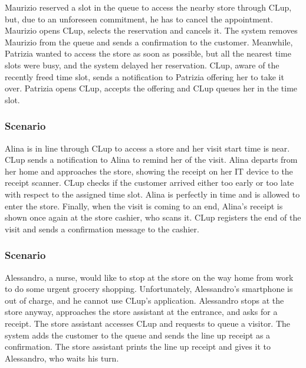 \documentclass[../../main.tex]{subfiles}
\begin{document}
  Maurizio reserved a slot in the queue to access the nearby store through CLup, but, due to an unforeseen commitment, 
  he has to cancel the appointment. Maurizio opens CLup, selects the reservation and cancels it. 
  The system removes Maurizio from the queue and sends a confirmation to the customer. 
  Meanwhile, Patrizia wanted to access the store as soon as possible, but all the nearest time slots were busy, 
  and the system delayed her reservation. CLup, aware of the recently freed time slot, sends a notification to Patrizia offering her to take it over. 
  Patrizia opens CLup, accepts the offering and CLup queues her in the time slot.


\subsubsection{Scenario }

  Alina is in line through CLup to access a store and her visit start time is near. 
  CLup sends a notification to Alina to remind her of the visit. 
  Alina departs from her home and approaches the store, showing the receipt on her IT device to the receipt scanner. 
  CLup checks if the customer arrived either too early or too late with respect to the assigned time slot. 
  Alina is perfectly in time and is allowed to enter the store. Finally, when the visit is coming to an end, 
  Alina's receipt is shown once again at the store cashier, who scans it. 
  CLup registers the end of the visit and sends a confirmation message to the cashier.


\subsubsection{Scenario }

  Alessandro, a nurse, would like to stop at the store on the way home from work to do some urgent grocery shopping. 
  Unfortunately, Alessandro's smartphone is out of charge, and he cannot use CLup's application. 
  Alessandro stops at the store anyway, approaches the store assistant at the entrance, and asks for a receipt. 
  The store assistant accesses CLup and requests to queue a visitor. The system adds the customer to the queue and sends the line up receipt as a confirmation. 
  The store assistant prints the line up receipt and gives it to Alessandro, who waits his turn.
\end{document}
